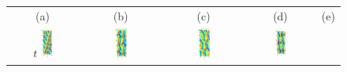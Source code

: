 \begin{figure}[t]
\begin{center}
\begin{tabular}{ccccc} (a) & (b) & (c) & (d) & (e)\\
$t$
\includegraphics[width=0.18\textwidth]{figs/ks22rpo016.3-02.86.eps}\hspace{-3ex} &
\includegraphics[width=0.18\textwidth]{figs/ks22rpo032.8-10.96.eps}\hspace{-3ex} &
\includegraphics[width=0.18\textwidth]{figs/ks22rpo033.5-04.04.eps}\hspace{-3ex} &
\includegraphics[width=0.18\textwidth]{figs/ks22rpo034.6-09.60.eps}\hspace{-3ex} &

\end{tabular}
\end{center}
\end{figure}
